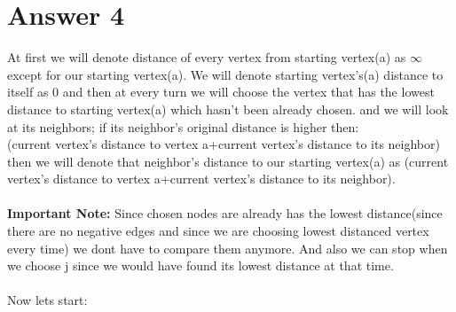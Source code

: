 \documentclass[12pt]{article}
\begin{document}
\section*{Answer 4}
At first we will denote distance of every vertex from starting vertex(a) as $\infty$ except for our starting vertex(a). We will denote starting vertex's(a) distance to itself as 0 and then at every turn we will choose the vertex that has the lowest distance to starting vertex(a) which hasn't been already chosen. and we will look at its neighbors; if its neighbor's original distance is higher then:\\
(current vertex's distance to vertex a+current vertex's distance to its neighbor)\\
then we will denote that neighbor's distance to our starting vertex(a) as (current vertex's distance to vertex a+current vertex's distance to its neighbor).\\
\\
\textbf{Important Note:} Since chosen nodes are already has the lowest distance(since there are no negative edges and since we are choosing lowest distanced vertex every time) we dont have to compare them anymore. And also we can stop when we choose j since we would have found its lowest distance at that time.\\
\\
Now lets start:\\
\end{document}
